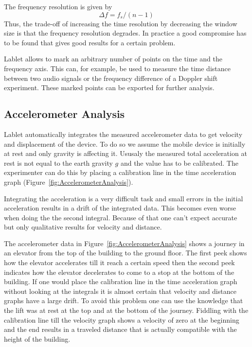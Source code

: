 \documentclass{sigchi}
\begin{document}
The frequency resolution is given by
\[
\Delta f = f_s / (n - 1)
\]
Thus, the trade-off of increasing the time resolution by decreasing the window size is that the frequency resolution degrades.
In practice a good compromise has to be found that gives good results for a certain problem.

Lablet allows to mark an arbitrary number of points on the time and the frequency axis.
This can, for example, be used to measure the time distance between two audio signals or the frequency difference of a Doppler shift experiment.
These marked points can be exported for further analysis.

\subsection{Accelerometer Analysis}
Lablet automatically integrates the measured accelerometer data to get velocity and displacement of the device.
To do so we assume the mobile device is initially at rest and only gravity is affecting it.
Ususaly the measured total acceleration at rest is not equal to the earth gravity $g$ and the value has to be calibrated.
The experimenter can do this by placing a calibration line in the time acceleration graph (Figure~\ref{fig:AccelerometerAnalysis}).

Integrating the acceleration is a very difficult task and small errors in the initial acceleration results in a drift of the integrated data.
This becomes even worse when doing the the second integral.
Because of that one can't expect accurate but only qualitative results for velocity and distance.

The accelerometer data in Figure~\ref{fig:AccelerometerAnalysis} shows a journey in an elevator from the top of the building to the ground floor.
The first peek shows how the elevator accelerates till it reach a certain speed then the second peek indicates how the elevator decelerates to come to a stop at the bottom of the building.
If one would place the calibration line in the time acceleration graph without looking at the integrals it is almost certain that velocity and distance graphs have a large drift.
To avoid this problem one can use the knowledge that the lift was at rest at the top and at the bottom of the journey.
Fiddling with the calibration line till the velocity graph shows a velocity of zero at the beginning and the end results in a traveled distance that is actually compatible with the height of the building.
\end{document}
